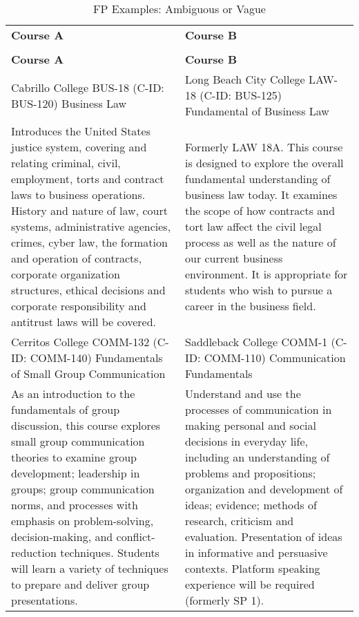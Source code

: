 \begin{longtable}{ >{\baselineskip=12pt}p{}  >{\baselineskip=12pt}p{} }
\captionsetup{skip=5pt}
\caption{FP Examples: Ambiguous or Vague}\label{tab:fp_vague}\\
\bottomrule\toprule
\textbf{Course A} & \textbf{Course B} \\
\bottomrule\toprule
\endfirsthead
\caption[]{FP Examples: Ambiguous or Vague}\\
\bottomrule\toprule
\textbf{Course A} & \textbf{Course B} \\
\bottomrule\toprule
\endhead
Cabrillo College \newline BUS-18 (C-ID: BUS-120) \newline Business Law & Long Beach City College \newline LAW-18 (C-ID: BUS-125) \newline Fundamental of Business Law \\
\midrule
Introduces the United States justice system, covering and relating criminal, civil, employment, torts and contract laws to business operations. History and nature of law, court systems, administrative agencies, crimes, cyber law, the formation and operation of contracts, corporate organization structures, ethical decisions and corporate responsibility and antitrust laws will be covered. & Formerly LAW 18A. This course is designed to explore the overall fundamental understanding of business law today. It examines the scope of how contracts and tort law affect the civil legal process as well as the nature of our current business environment. It is appropriate for students who wish to pursue a career in the business field. \\
\bottomrule\toprule
Cerritos College \newline COMM-132 (C-ID: COMM-140) \newline Fundamentals of Small Group Communication & Saddleback College \newline COMM-1 (C-ID: COMM-110) \newline Communication Fundamentals \\
\midrule
As an introduction to the fundamentals of group discussion, this course explores small group communication theories to examine group development; leadership in groups; group communication norms, and processes with emphasis on problem-solving, decision-making, and conflict-reduction techniques. Students will learn a variety of techniques to prepare and deliver group presentations. & Understand and use the processes of communication in making personal and social decisions in everyday life, including an understanding of problems and propositions; organization and development of ideas; evidence; methods of research, criticism and evaluation. Presentation of ideas in informative and persuasive contexts. Platform speaking experience will be required (formerly SP 1). \\
\bottomrule\toprule
\end{longtable}

